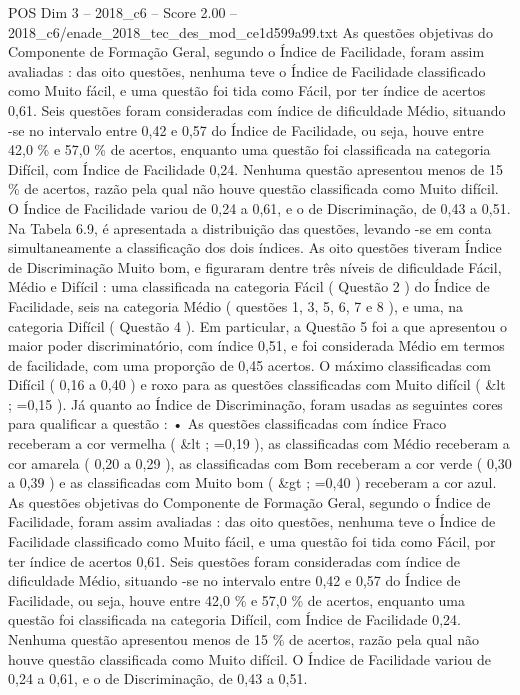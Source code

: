 \begin{textsample}{POS Dim 3 – 2018\_c6 – Score 2.00 – 2018\_c6/enade\_2018\_tec\_des\_mod\_ce1d599a99.txt}
As questões objetivas do Componente de Formação Geral, segundo o Índice de Facilidade, foram assim avaliadas : das oito questões, nenhuma teve o Índice de Facilidade classificado como Muito fácil, e uma questão foi tida como Fácil, por ter índice de acertos 0,61.
Seis questões foram consideradas com índice de dificuldade Médio, situando -se no intervalo entre 0,42 e 0,57 do Índice de Facilidade, ou seja, houve entre 42,0 \% e 57,0 \% de acertos, enquanto uma questão foi classificada na categoria Difícil, com Índice de Facilidade 0,24.
Nenhuma questão apresentou menos de 15 \% de acertos, razão pela qual não houve questão classificada como Muito difícil.
O Índice de Facilidade variou de 0,24 a 0,61, e o de Discriminação, de 0,43 a 0,51.
Na Tabela 6.9, é apresentada a distribuição das questões, levando -se em conta simultaneamente a classificação dos dois índices.
As oito questões tiveram Índice de Discriminação Muito bom, e figuraram dentre três níveis de dificuldade Fácil, Médio e Difícil : uma classificada na categoria Fácil ( Questão 2 ) do Índice de Facilidade, seis na categoria Médio ( questões 1, 3, 5, 6, 7 e 8 ), e uma, na categoria Difícil ( Questão 4 ).
Em particular, a Questão 5 foi a que apresentou o maior poder discriminatório, com índice 0,51, e foi considerada Médio em termos de facilidade, com uma proporção de 0,45 acertos.
O máximo classificadas com Difícil ( 0,16 a 0,40 ) e roxo para as questões classificadas com Muito difícil ( \&lt ; =0,15 ).
Já quanto ao Índice de Discriminação, foram usadas as seguintes cores para qualificar a questão : • As questões classificadas com índice Fraco receberam a cor vermelha ( \&lt ; =0,19 ), as classificadas com Médio receberam a cor amarela ( 0,20 a 0,29 ), as classificadas com Bom receberam a cor verde ( 0,30 a 0,39 ) e as classificadas com Muito bom ( \&gt ; =0,40 ) receberam a cor azul.
As questões objetivas do Componente de Formação Geral, segundo o Índice de Facilidade, foram assim avaliadas : das oito questões, nenhuma teve o Índice de Facilidade classificado como Muito fácil, e uma questão foi tida como Fácil, por ter índice de acertos 0,61.
Seis questões foram consideradas com índice de dificuldade Médio, situando -se no intervalo entre 0,42 e 0,57 do Índice de Facilidade, ou seja, houve entre 42,0 \% e 57,0 \% de acertos, enquanto uma questão foi classificada na categoria Difícil, com Índice de Facilidade 0,24.
Nenhuma questão apresentou menos de 15 \% de acertos, razão pela qual não houve questão classificada como Muito difícil.
O Índice de Facilidade variou de 0,24 a 0,61, e o de Discriminação, de 0,43 a 0,51.

\end{textsample}
